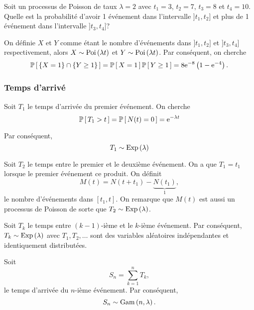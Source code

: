 \documentclass[11pt]{article}
\renewcommand\P[1]{%
	\ensuremath{%
		\mathbb{P}\left[\,#1\,\right]%
	}%
}%
\newcommand\e{%
	\ensuremath{%
		\mathrm{e}%
	}%
}%
\newcommand\Poi[1]{%
	\ensuremath{%
		\mathrm{Poi}\left(#1\right)%
	}%
}%
\newcommand\Exp[1]{%
	\ensuremath{%
		\mathrm{Exp}\left(#1\right)%
	}%
}%
\newcommand\Gam[2]{%
	\ensuremath{%
		\mathrm{Gam}\left(#1,#2\right)%
	}%
}%
\theoremstyle{remark}
\theoremstyle{definition}
\begin{document}
\begin{exemple}
	Soit un processus de Poisson de taux $\lambda=2$ avec $t_1=3$, $t_2=7$,
	$t_3=8$ et $t_4=10$. Quelle est la probabilité d'avoir 1 événement dans
	l'intervalle $]t_1,t_2]$ et plus de 1 événement dans l'intervalle
	$]t_3,t_4]$?
	
	On définie $X$ et $Y$ comme étant le nombre d'événements dans $]t_1,t_2]$
	et $]t_3,t_4]$ respectivement, alors $X\sim\Poi{\lambda t}$ et
	$Y\sim\Poi{\lambda t}$. Par conséquent, on cherche
	\begin{equation*}
		\P{\left\{X=1\right\}\cap\left\{Y\geq 1\right\}}
		=\P{X=1}\P{Y\geq 1}
		=8\e^{-8}\left(1-\e^{-4}\right).
	\end{equation*}
\end{exemple}

\subsubsection{Temps d'arrivé}
Soit $T_1$ le temps d'arrivée du premier événement. On cherche
\begin{equation*}
	\P{T_1>t}
	=\P{N(t)=0}
	=\e^{-\lambda t}
\end{equation*}
%

Par conséquent,
\begin{equation*}
	T_1\sim\Exp{\lambda}
\end{equation*}

Soit $T_2$ le temps entre le premier et le deuxième événement. On a que 
$T_1=t_1$ lorsque le premier événement ce produit. On définit
\begin{equation*}
	M(t)=N(t+t_1)-\underbrace{N(t_1)}_{1},
\end{equation*}
le nombre d'événements dans $[t_1,t]$. On remarque que $M(t)$ est aussi un
processus de Poisson de sorte que $T_2\sim\Exp{\lambda}$.

Soit $T_k$ le temps entre $(k-1)$-ième et le $k$-ième événement. Par
conséquent, $T_k\sim\Exp{\lambda}$ avec $T_1,T_2,\dots$ sont des variables
aléatoires indépendantes et identiquement distributées.

Soit
\begin{equation*}
	S_n=\sum_{k=1}^nT_k,
\end{equation*}
le temps d'arrivée du $n$-ième événement. Par conséquent,
\begin{equation*}
	S_n\sim\Gam{n}{\lambda}.
\end{equation*}
\end{document}
